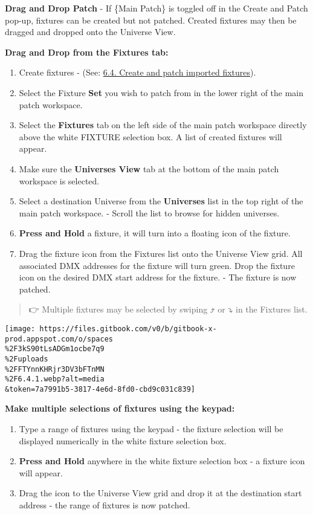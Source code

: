 \documentclass[
]{article}
\begin{document}
\textbf{Drag and Drop Patch} - If \{Main Patch\} is toggled off in the Create and Patch pop-up, fixtures can be created but not patched. Created fixtures may then be dragged and dropped onto the Universe View.

\textbf{Drag and Drop from the Fixtures tab:}

\begin{enumerate}
\def\labelenumi{\arabic{enumi}.}
\item
  Create fixtures - (See: \href{https://vibemanual.compulite.com/patch.html\#create-and-patch-imported-fixtures}{6.4. Create and patch imported fixtures}).
\item
  Select the Fixture \textbf{Set} you wish to patch from in the lower right of the main patch workspace.
\item
  Select the \textbf{Fixtures} tab on the left side of the main patch workspace directly above the white FIXTURE selection box. A list of created fixtures will appear.
\item
  Make sure the \textbf{Universes View} tab at the bottom of the main patch workspace is selected.
\item
  Select a destination Universe from the \textbf{Universes} list in the top right of the main patch workspace. - Scroll the list to browse for hidden universes.
\item
  \textbf{Press and Hold} a fixture, it will turn into a floating icon of the fixture.
\item
  Drag the fixture icon from the Fixtures list onto the Universe View grid. All associated DMX addresses for the fixture will turn green. Drop the fixture icon on the desired DMX start address for the fixture. - The fixture is now patched.
\end{enumerate}

\begin{quote}
👉 Multiple fixtures may be selected by swiping ⤴ or ⤵ in the Fixtures list.
\end{quote}

\texttt{[image: https://files.gitbook.com/v0/b/gitbook-x-prod.appspot.com/o/spaces\\\%2F3kS90tLsADGm1ocbe7q9\\\%2Fuploads\\\%2FFTYnnKHRjr3DV3bFTnMN\\\%2F6.4.1.webp?alt=media\\\&token=7a7991b5-3817-4e6d-8fd0-cbd9c031c839]}

\textbf{Make multiple selections of fixtures using the keypad:}

\begin{enumerate}
\def\labelenumi{\arabic{enumi}.}
\item
  Type a range of fixtures using the keypad - the fixture selection will be displayed numerically in the white fixture selection box.
\item
  \textbf{Press and Hold} anywhere in the white fixture selection box - a fixture icon will appear.
\item
  Drag the icon to the Universe View grid and drop it at the destination start address - the range of fixtures is now patched.
\end{enumerate}
\end{document}
